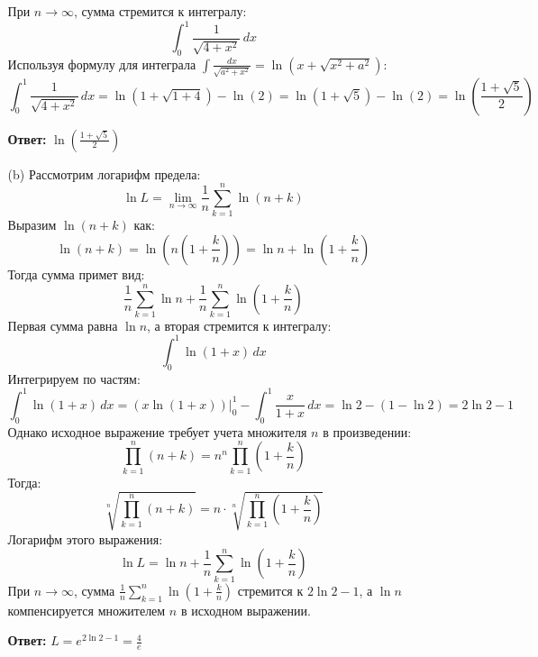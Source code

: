 \documentclass[a4paper]{article}
\begin{document}
\begin{enumerate}
\begin{enumerate}
        При \( n \to \infty \), сумма стремится к интегралу:  
        \[
        \int_{0}^{1} \frac{1}{\sqrt{4 + x^2}} \, dx
        \]  
        Используя формулу для интеграла \( \int \frac{dx}{\sqrt{a^2 + x^2}} = \ln(x + \sqrt{x^2 + a^2}) \):  
        \[
        \int_{0}^{1} \frac{1}{\sqrt{4 + x^2}} \, dx = \ln\left(1 + \sqrt{1 + 4}\right) - \ln(2) = \ln(1 + \sqrt{5}) - \ln(2) = \ln\left(\frac{1 + \sqrt{5}}{2}\right)
        \]
        
        \textbf{Ответ: } $\ln\left(\frac{1 + \sqrt{5}}{2}\right)$\\

        \item[(b)]Рассмотрим логарифм предела:  
        \[
        \ln L = \lim_{n \to \infty} \frac{1}{n} \sum_{k=1}^{n} \ln(n + k)
        \]  
        Выразим \( \ln(n + k) \) как:  
        \[
        \ln(n + k) = \ln\left(n \left(1 + \frac{k}{n}\right)\right) = \ln n + \ln\left(1 + \frac{k}{n}\right)
        \]  
        Тогда сумма примет вид:  
        \[
        \frac{1}{n} \sum_{k=1}^{n} \ln n + \frac{1}{n} \sum_{k=1}^{n} \ln\left(1 + \frac{k}{n}\right)
        \]  
        Первая сумма равна \( \ln n \), а вторая стремится к интегралу:  
        \[
        \int_{0}^{1} \ln(1 + x) \, dx
        \]  
        Интегрируем по частям:  
        \[
        \int_{0}^{1} \ln(1 + x) \, dx = (x \ln(1 + x))\bigg|_{0}^{1} - \int_{0}^{1} \frac{x}{1 + x} \, dx = \ln 2 - \left(1 - \ln 2\right) = 2 \ln 2 - 1
        \]  
        Однако исходное выражение требует учета множителя \( n \) в произведении:  
        \[
        \prod_{k=1}^{n} (n + k) = n^n \prod_{k=1}^{n} \left(1 + \frac{k}{n}\right)
        \]  
        Тогда:  
        \[
        \sqrt[n]{\prod_{k=1}^{n} (n + k)} = n \cdot \sqrt[n]{\prod_{k=1}^{n} \left(1 + \frac{k}{n}\right)}
        \]  
        Логарифм этого выражения:  
        \[
        \ln L = \ln n + \frac{1}{n} \sum_{k=1}^{n} \ln\left(1 + \frac{k}{n}\right)
        \]  
        При \( n \to \infty \), сумма \( \frac{1}{n} \sum_{k=1}^{n} \ln\left(1 + \frac{k}{n}\right) \) стремится к \( 2 \ln 2 - 1 \), а \( \ln n \) компенсируется множителем \( n \) в исходном выражении.  

        \textbf{Ответ: } $ L = e^{2 \ln 2 - 1} = \frac{4}{e} $\\
    \end{enumerate}



\end{enumerate}
\end{document}

